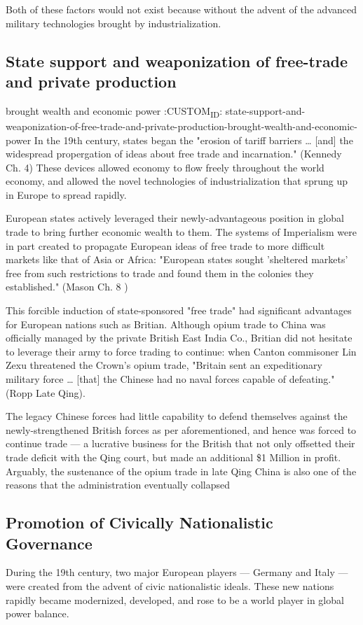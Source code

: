 \documentclass[letterpaper]{article}
\begin{document}
Both of these factors would not exist because without the advent of the
advanced military technologies brought by industrialization.

\subsection{State support and weaponization of free-trade and private production}
\label{sec:org75aa1f4}
brought wealth and economic power
:CUSTOM\textsubscript{ID}: state-support-and-weaponization-of-free-trade-and-private-production-brought-wealth-and-economic-power
In the 19th century, states began the "erosion of tariff barriers \ldots{}
[and] the widespread propergation of ideas about free trade and
incarnation." (Kennedy Ch. 4) These devices allowed economy to flow
freely throughout the world economy, and allowed the novel technologies
of industrialization that sprung up in Europe to spread rapidly.

European states actively leveraged their newly-advantageous position in
global trade to bring further economic wealth to them. The systems of
Imperialism were in part created to propagate European ideas of free
trade to more difficult markets like that of Asia or Africa: "European
states sought 'sheltered markets' free from such restrictions to trade
and found them in the colonies they established." (Mason Ch. 8 )

This forcible induction of state-sponsored "free trade" had significant
advantages for European nations such as Britian. Although opium trade to
China was officially managed by the private British East India Co.,
Britian did not hesitate to leverage their army to force trading to
continue: when Canton commisoner Lin Zexu threatened the Crown's opium
trade, "Britain sent an expeditionary military force \ldots{} [that] the
Chinese had no naval forces capable of defeating." (Ropp Late Qing).

The legacy Chinese forces had little capability to defend themselves
against the newly-strengthened British forces as per aforementioned, and
hence was forced to continue trade --- a lucrative business for the
British that not only offsetted their trade deficit with the Qing court,
but made an additional \$1 Million in profit. Arguably, the sustenance of
the opium trade in late Qing China is also one of the reasons that the
administration eventually collapsed

\subsection{Promotion of Civically Nationalistic Governance}
\label{sec:org63861af}
During the 19th century, two major European players --- Germany and
Italy --- were created from the advent of civic nationalistic ideals.
These new nations rapidly became modernized, developed, and rose to be a
world player in global power balance.
\end{document}
